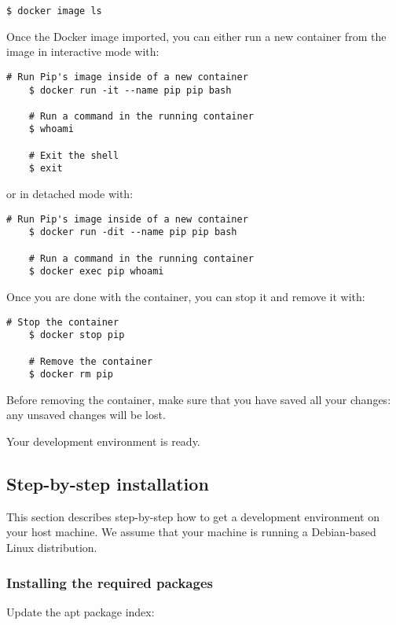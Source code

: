 \documentclass[10pt,a4paper,titlepage]{refart}
\begin{document}
\begin{lstlisting}[style=BashStyle]
$ docker image ls
\end{lstlisting}

Once the Docker image imported, you can either run a new container from the
image in interactive mode with:

\begin{lstlisting}[style=BashStyle]
    # Run Pip's image inside of a new container
    $ docker run -it --name pip pip bash

    # Run a command in the running container
    $ whoami

    # Exit the shell
    $ exit
\end{lstlisting}

or in detached mode with:

\begin{lstlisting}[style=BashStyle]
    # Run Pip's image inside of a new container
    $ docker run -dit --name pip pip bash

    # Run a command in the running container
    $ docker exec pip whoami
\end{lstlisting}

Once you are done with the container, you can stop it and remove it with:

\begin{lstlisting}[style=BashStyle]
    # Stop the container
    $ docker stop pip

    # Remove the container
    $ docker rm pip
\end{lstlisting}

Before removing the container, make sure that you have saved all your changes:
any unsaved changes will be lost.

Your development environment is ready.

\subsection{Step-by-step installation}

This section describes step-by-step how to get a development environment on your
host machine. We assume that your machine is running a Debian-based Linux
distribution.

\subsubsection{Installing the required packages}

Update the apt package index:
\end{document}
